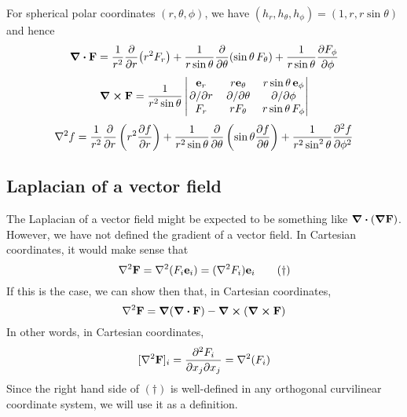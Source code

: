 For spherical polar coordinates \((r, \theta, \phi)\), we have \((h_r, h_\theta, h_\phi) = (1, r, r\sin\theta)\) and hence
\[
	\div{\vb F} = \frac{1}{r^2} \pdv{r}(r^2 F_r) + \frac{1}{r\sin\theta} \pdv{\theta}(\sin \theta\, F_\theta) + \frac{1}{r\sin\theta} \pdv{F_\phi}{\phi}
\]
\[
	\curl{\vb F} = \frac{1}{r^2\sin\theta} \begin{vmatrix}
		\vb e_r  & r \vb e_\theta & r\sin\theta\, \vb e_\phi \\
		\pdv*{r} & \pdv*{\theta}  & \pdv*{\phi}              \\
		F_r      & r F_\theta     & r\sin\theta\, F_\phi
	\end{vmatrix}
\]
\[
	\laplacian{f} = \frac{1}{r^2} \pdv{r} \left( r^2 \pdv{f}{r} \right) + \frac{1}{r^2 \sin\theta} \pdv{\theta} \left( \sin \theta \pdv{f}{\theta} \right) + \frac{1}{r^2\sin^2 \theta} \pdv[2]{f}{\phi}
\]

\subsection{Laplacian of a vector field}
The Laplacian of a vector field might be expected to be something like \(\div(\grad {\vb F})\).
However, we have not defined the gradient of a vector field.
In Cartesian coordinates, it would make sense that
\begin{equation}
	\laplacian{\vb F} = \laplacian(F_i \vb e_i) = (\laplacian{F_i})\vb e_i
	\tag{\(\dagger\)}
\end{equation}
If this is the case, we can show then that, in Cartesian coordinates,
\[
	\laplacian{\vb F} = \grad(\div{\vb F}) - \curl(\curl{\vb F})
\]
In other words, in Cartesian coordinates,
\[
	[\laplacian{\vb F}]_i = \pdv{F_i}{x_j}{x_j} = \laplacian(F_i)
\]
Since the right hand side of \((\dagger)\) is well-defined in any orthogonal curvilinear coordinate system, we will use it as a definition.

